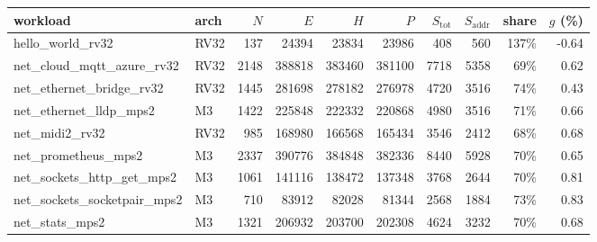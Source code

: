 \begin{tabular}{llrrrrrrrr}
\toprule
workload & arch & $N$ & $E$ & $H$ & $P$ & $S_\mathrm{tot}$ & $S_\mathrm{addr}$ & share & $g$ (\%) \\
\midrule
hello\_world\_rv32 & RV32 & 137 & 24394 & 23834 & 23986 & 408 & 560 & 137\% & -0.64 \\
net\_cloud\_mqtt\_azure\_rv32 & RV32 & 2148 & 388818 & 383460 & 381100 & 7718 & 5358 & 69\% & 0.62 \\
net\_ethernet\_bridge\_rv32 & RV32 & 1445 & 281698 & 278182 & 276978 & 4720 & 3516 & 74\% & 0.43 \\
net\_ethernet\_lldp\_mps2 & M3 & 1422 & 225848 & 222332 & 220868 & 4980 & 3516 & 71\% & 0.66 \\
net\_midi2\_rv32 & RV32 & 985 & 168980 & 166568 & 165434 & 3546 & 2412 & 68\% & 0.68 \\
net\_prometheus\_mps2 & M3 & 2337 & 390776 & 384848 & 382336 & 8440 & 5928 & 70\% & 0.65 \\
net\_sockets\_http\_get\_mps2 & M3 & 1061 & 141116 & 138472 & 137348 & 3768 & 2644 & 70\% & 0.81 \\
net\_sockets\_socketpair\_mps2 & M3 & 710 & 83912 & 82028 & 81344 & 2568 & 1884 & 73\% & 0.83 \\
net\_stats\_mps2 & M3 & 1321 & 206932 & 203700 & 202308 & 4624 & 3232 & 70\% & 0.68 \\
\bottomrule
\end{tabular}
